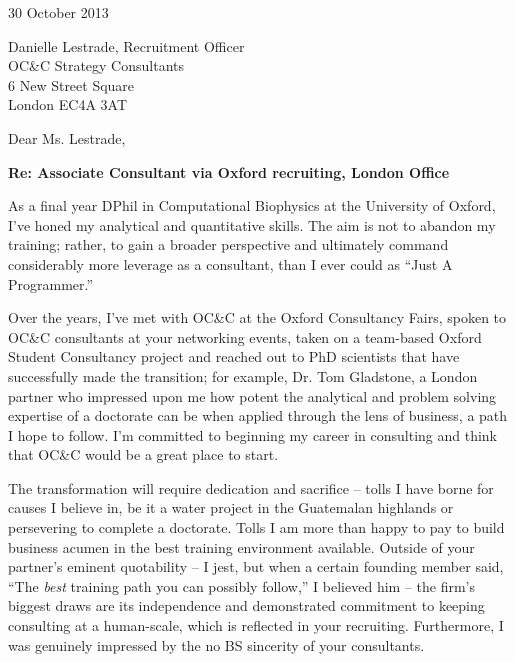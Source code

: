 \documentclass{../res}
\begin{document}
 
\begin{sloppypar}
 
%


\begin{resume} 
 
30 October 2013

Danielle Lestrade, Recruitment Officer \\
OC\&C Strategy Consultants \\
6 New Street Square \\
London EC4A 3AT

Dear Ms. Lestrade, %

\textbf{Re: Associate Consultant via Oxford recruiting, London Office}

As a final year DPhil in Computational Biophysics at the University of Oxford, I've honed my analytical and quantitative skills. The aim is not to abandon my training; rather, to gain a broader perspective and ultimately command considerably more leverage as a consultant, than I ever could as ``Just A Programmer.'' 

Over the years, I've met with OC\&C at the Oxford Consultancy Fairs, spoken to OC\&C consultants at your networking events, taken on a team-based Oxford Student Consultancy project and reached out to PhD scientists that have successfully made the transition; for example, Dr. Tom Gladstone, a London partner who impressed upon me how potent the analytical and problem solving expertise of a doctorate can be when applied through the lens of business, a path I hope to follow. I'm committed to beginning my career in consulting and think that OC\&C would be a great place to start.

The transformation will require dedication and sacrifice -- tolls I have borne for causes I believe in, be it a water project in the Guatemalan highlands or persevering to complete a doctorate. Tolls I am more than happy to pay to build business acumen in the best training environment available. Outside of your partner's eminent quotability -- I jest, but when a certain founding member said, ``The \emph{best} training path you can possibly follow,'' I believed him -- the firm's biggest draws are its independence and demonstrated commitment to keeping consulting at a human-scale, which is reflected in your recruiting. Furthermore, I was genuinely impressed by the no BS sincerity of your consultants. 


\end{resume}
\end{sloppypar}
\end{document}
